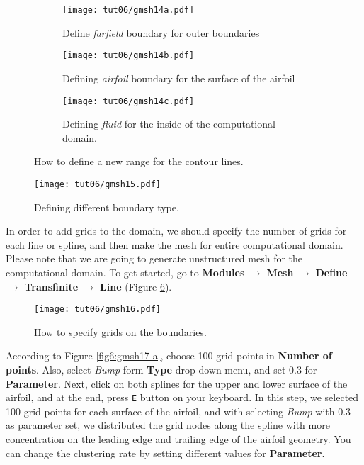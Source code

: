\begin{figure}[htbp]
    \centering
     \begin{subfigure}[b]{.4\textwidth}
         \centering
         \texttt{[image: tut06/gmsh14a.pdf]}
         \caption{Define \textit{farfield} boundary for outer boundaries}
         \label{fig6:gmsh14 a}
     \end{subfigure}
     \hfill
     \begin{subfigure}[b]{.4\textwidth}
         \centering
         \texttt{[image: tut06/gmsh14b.pdf]}
         \caption{Defining \textit{airfoil} boundary for the surface of the airfoil}
         \label{fig6:gmsh14 b}
     \end{subfigure}  
     \hfill
     \begin{subfigure}[b]{.4\textwidth}
         \centering
         \texttt{[image: tut06/gmsh14c.pdf]}
         \caption{Defining \textit{fluid} for the inside of the computational domain.}
         \label{fig6:gmsh14 c}
     \end{subfigure} 
    \caption{How to define a new range for the contour lines.}
    \label{fig6:gmsh14}
\end{figure}
\begin{figure}[htbp]
    \centering
    \texttt{[image: tut06/gmsh15.pdf]}
    \caption{Defining different boundary type.}
    \label{fig6:gmsh15}
\end{figure}
In order to add grids to the domain, we should specify the number of grids for each line or spline, and then make the mesh for entire computational domain. Please note that we are going to generate unstructured mesh for the computational domain. To get started, go to \textbf{Modules} $\rightarrow$ \textbf{Mesh} $\rightarrow$ \textbf{Define} $\rightarrow$ \textbf{Transfinite} $\rightarrow$ \textbf{Line} (Figure \ref{fig6:gmsh16}).
\begin{figure}[htbp]
    \centering
    \texttt{[image: tut06/gmsh16.pdf]}
    \caption{How to specify grids on the boundaries.}
    \label{fig6:gmsh16}
\end{figure}
According to Figure \ref{fig6:gmsh17 a}, choose 100 grid points in \textbf{Number of points}. Also, select \textit{Bump} form \textbf{Type} drop-down menu, and set 0.3 for \textbf{Parameter}. Next, click on both splines for the upper and lower surface of the airfoil, and at the end, press \texttt{E} button on your keyboard. In this step, we selected 100 grid points for each surface of the airfoil, and with selecting \textit{Bump} with 0.3 as parameter set, we distributed the grid nodes along the spline with more concentration on the leading edge and trailing edge of the airfoil geometry. You can change the clustering rate by setting different values for \textbf{Parameter}.
